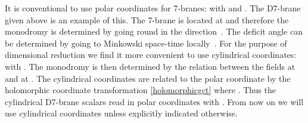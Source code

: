 \documentclass[12pt,a4paper]{article}
\begin{document}
It is conventional to use polar coordinates for 7-branes:
\coordHE{} with \coordHE{} and \myHighlight{$0\leq \theta< 2\pi$}\coordHE{}. The
D7-brane given above is an example of this. The 7-brane is located
at \coordHE{} and therefore the monodromy is determined by going round
in the \myHighlight{$\theta$}\coordHE{} direction~\cite{Meessen:1998qm}. The deficit angle
can be determined by going to Minkowski space-time
locally~\cite{Dabholkar:1997zd}. For the purpose of dimensional
reduction we find it more convenient to use cylindrical
coordinates: \coordHE{} with \coordHE{}.
The monodromy is then determined by the relation
between the fields at \coordHE{} and at \coordHE{}. The cylindrical
coordinates \coordHE{} are related to the polar coordinate \coordHE{} by the
holomorphic coordinate transformation \eqref{holomorphicgct} where
\coordHE{}. Thus the cylindrical D7-brane scalars
\coordHE{} read in polar coordinates \coordHE{} with
\coordHE{} \cite{Bergshoeff:1996ui}.
From now on we will use cylindrical coordinates unless explicitly
indicated otherwise.
\end{document}
